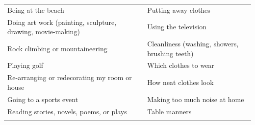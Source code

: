 \documentclass[]{book}
\begin{document}
\begin{longtable}[]{@{}ll@{}}
\begin{minipage}[t]{0.50\columnwidth}
Being at the beach\strut
\end{minipage} & \begin{minipage}[t]{0.44\columnwidth}\raggedright
Putting away clothes\strut
\end{minipage}\tabularnewline
\begin{minipage}[t]{0.50\columnwidth}\raggedright
Doing art work (painting, sculpture, drawing, movie-making)\strut
\end{minipage} & \begin{minipage}[t]{0.44\columnwidth}\raggedright
Using the television\strut
\end{minipage}\tabularnewline
\begin{minipage}[t]{0.50\columnwidth}\raggedright
Rock climbing or mountaineering\strut
\end{minipage} & \begin{minipage}[t]{0.44\columnwidth}\raggedright
Cleanliness (washing, showers, brushing teeth)\strut
\end{minipage}\tabularnewline
\begin{minipage}[t]{0.50\columnwidth}\raggedright
Playing golf\strut
\end{minipage} & \begin{minipage}[t]{0.44\columnwidth}\raggedright
Which clothes to wear\strut
\end{minipage}\tabularnewline
\begin{minipage}[t]{0.50\columnwidth}\raggedright
Re-arranging or redecorating my room or house\strut
\end{minipage} & \begin{minipage}[t]{0.44\columnwidth}\raggedright
How neat clothes look\strut
\end{minipage}\tabularnewline
\begin{minipage}[t]{0.50\columnwidth}\raggedright
Going to a sports event\strut
\end{minipage} & \begin{minipage}[t]{0.44\columnwidth}\raggedright
Making too much noise at home\strut
\end{minipage}\tabularnewline
\begin{minipage}[t]{0.50\columnwidth}\raggedright
Reading stories, novels, poems, or plays\strut
\end{minipage} & \begin{minipage}[t]{0.44\columnwidth}\raggedright
Table manners\strut
\end{minipage}\tabularnewline
\begin{minipage}[t]{0.50\columnwidth}\raggedright

\end{minipage}
\end{longtable}
\end{document}
